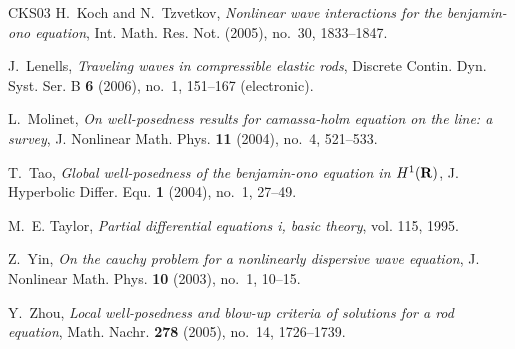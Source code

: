 \documentclass[12pt,reqno]{amsart}
\numberwithin{equation}{section}  %
\numberwithin{figure}{section}
\begin{document}
\begin{thebibliography}{CKS{\etalchar{+}}03}
H.~Koch and N.~Tzvetkov, \emph{Nonlinear wave interactions for the benjamin-ono
equation}, Int. Math. Res. Not. (2005), no.~30, 1833--1847.

J.~Lenells, \emph{Traveling waves in compressible elastic rods}, Discrete
Contin. Dyn. Syst. Ser. B \textbf{6} (2006), no.~1, 151--167 (electronic).

L.~Molinet, \emph{On well-posedness results for camassa-holm equation on the
line: a survey}, J. Nonlinear Math. Phys. \textbf{11} (2004), no.~4,
521--533.

T.~Tao, \emph{Global well-posedness of the benjamin-ono equation in $H^1(\bf
R)$}, J. Hyperbolic Differ. Equ. \textbf{1} (2004), no.~1, 27--49.

M.~E. Taylor, \emph{Partial differential equations i, basic theory}, vol. 115,
1995.

Z.~Yin, \emph{On the cauchy problem for a nonlinearly dispersive wave
equation}, J. Nonlinear Math. Phys. \textbf{10} (2003), no.~1, 10--15.

Y.~Zhou, \emph{Local well-posedness and blow-up criteria of solutions for a rod
equation}, Math. Nachr. \textbf{278} (2005), no.~14, 1726--1739.

\end{thebibliography}
%
%
%
%
\end{document}
